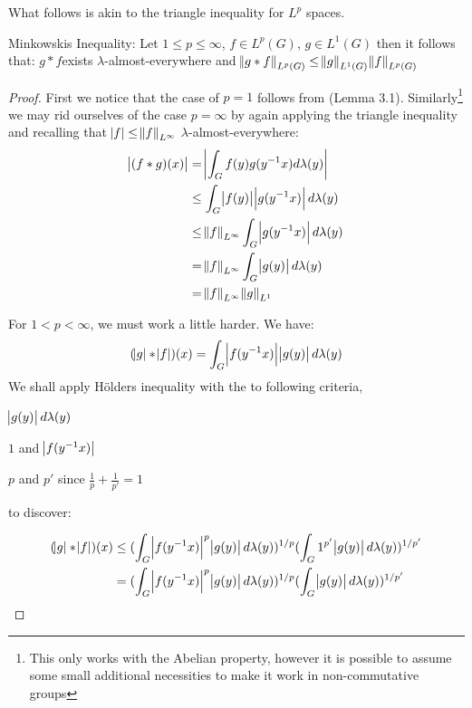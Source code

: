 What follows is akin to the triangle inequality for $L^p$ spaces.

\begin{theorem}
Minkowskis Inequality: Let $1 \leq p \leq \infty$, $f \in L^p (G)$, $g \in L^1(G)$ then it follows that: 
$g \ast f $exists $\lambda$-almost-everywhere and
$ \norm{g \ast f}_{L^p(G)} \leq \norm{g}_{L^1(G)} \norm{f}_{L^p(G)} $
\end{theorem}

\begin{proof}
First we notice that the case of $p=1$ follows from (Lemma 3.1). Similarly\footnote{This only works with the Abelian property, however it is possible to assume some small additional necessities to make it work in non-commutative groups} we may rid ourselves of the case $p=\infty$ by again applying the triangle inequality and recalling that $\abs{f} \leq \norm{f}_{L^\infty}$ $\lambda$-almost-everywhere:
\begin{align*}
\abs{(f \ast g)(x)} &= \abs{\int_G f(y)g(y^{-1}x) d\lambda(y)} \\
&\leq \int_G \abs{f(y)} \abs{g(y^{-1}x)} d\lambda(y) \\
&\leq \norm{f}_{L^\infty} \int_G \abs{g(y^{-1}x)} d\lambda(y) \\
&= \norm{f}_{L^\infty} \int_G \abs{g(y)} d\lambda(y) \\
&= \norm{f}_{L^\infty} \norm{g}_{L^1}
\end{align*}

For $ 1 < p < \infty$, we must work a little harder. We have:
\begin{equation*}
(\abs{g} \ast \abs{f} )(x) = \int_G \abs{f(y^{-1}x)}\abs{g(y)} d\lambda(y)
\end{equation*}
We shall apply H\"olders inequality with the to following criteria,

\begin{description}
[align=right,labelwidth=3cm]
\item [Measure] $\abs{g(y)} d\lambda(y)$
\item [Functions] $1$ and $\abs{f(y^{-1}x)}$
\item [Exponents] $p$ and $p'$ since $\frac{1}{p}+\frac{1}{p'} = 1$
\end{description}

to discover:

\begin{align*}
(\abs{g} \ast \abs{f} )(x) &\leq (\int_G \abs{f(y^{-1}x)}^p \abs{g(y)} d\lambda(y))^{1/p} (\int_G 1^{p'} \abs{g(y)} 
 d\lambda(y))^{1/p'} \\
 &= (\int_G \abs{f(y^{-1}x)}^p \abs{g(y)} d\lambda(y))^{1/p} (\int_G \abs{g(y)} 
 d\lambda(y))^{1/p'}
\end{align*}


\end{proof}
